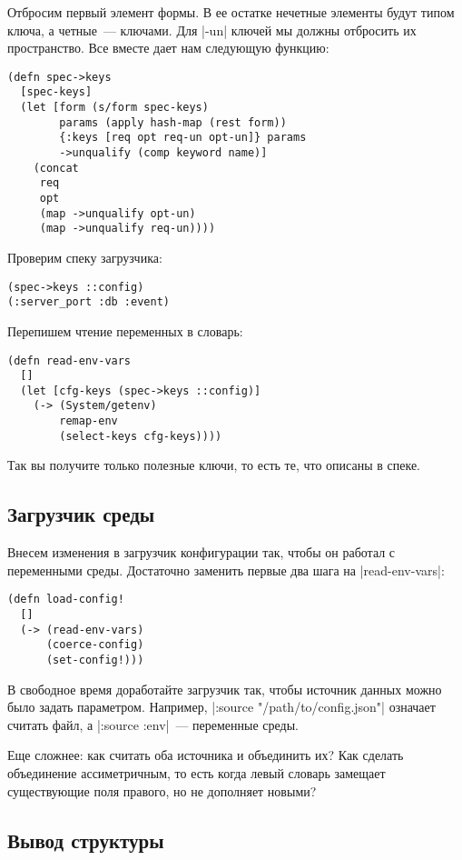 Отбросим первый элемент формы. В ее остатке нечетные элементы будут типом ключа,
а четные~--- ключами. Для \spverb|-un| ключей мы должны отбросить их пространство. Все
вместе дает нам следующую функцию:

\begin{verbatim}
(defn spec->keys
  [spec-keys]
  (let [form (s/form spec-keys)
        params (apply hash-map (rest form))
        {:keys [req opt req-un opt-un]} params
        ->unqualify (comp keyword name)]
    (concat
     req
     opt
     (map ->unqualify opt-un)
     (map ->unqualify req-un))))
\end{verbatim}

Проверим спеку загрузчика:

\begin{verbatim}
(spec->keys ::config)
(:server_port :db :event)
\end{verbatim}

Перепишем чтение переменных в словарь:

\begin{verbatim}
(defn read-env-vars
  []
  (let [cfg-keys (spec->keys ::config)]
    (-> (System/getenv)
        remap-env
        (select-keys cfg-keys))))
\end{verbatim}

Так вы получите только полезные ключи, то есть те, что описаны в спеке.

\subsection{Загрузчик среды}

Внесем изменения в загрузчик конфигурации так, чтобы он работал с переменными
среды. Достаточно заменить первые два шага на \spverb|read-env-vars|:

\begin{verbatim}
(defn load-config!
  []
  (-> (read-env-vars)
      (coerce-config)
      (set-config!)))
\end{verbatim}

В свободное время доработайте загрузчик так, чтобы источник данных можно было
задать параметром. Например, \spverb|:source "/path/to/config.json"| означает считать
файл, а \spverb|:source :env|~--- переменные среды.

Еще сложнее: как считать оба источника и объединить их? Как сделать объединение
ассиметричным, то есть когда левый словарь замещает существующие поля правого,
но не дополняет новыми?

\subsection{Вывод структуры}

